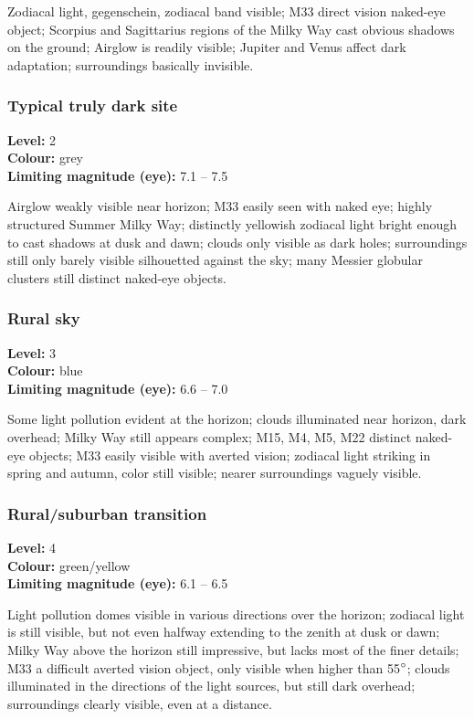 Zodiacal light, gegenschein, zodiacal band visible; M33 direct vision naked-eye object; Scorpius and Sagittarius regions of the Milky Way cast obvious shadows on the ground; Airglow is readily visible; Jupiter and Venus affect dark adaptation; surroundings basically invisible.

\subsubsection{Typical truly dark site}
\textbf{Level:} 2 \\
\textbf{Colour:} grey \\
\textbf{Limiting magnitude (eye):} 7.1 -- 7.5

Airglow weakly visible near horizon; M33 easily seen with naked eye; highly structured Summer Milky Way; distinctly yellowish zodiacal light bright enough to cast shadows at dusk and dawn; clouds only visible as dark holes; surroundings still only barely visible silhouetted against the sky; many Messier globular clusters still distinct naked-eye objects.

\subsubsection{Rural sky}
\textbf{Level:} 3 \\
\textbf{Colour:} blue \\
\textbf{Limiting magnitude (eye):} 6.6 -- 7.0

Some light pollution evident at the horizon; clouds illuminated near horizon, dark overhead; Milky Way still appears complex; M15, M4, M5, M22 distinct naked-eye objects; M33 easily visible with averted vision; zodiacal light striking in spring and
autumn, color still visible; nearer surroundings vaguely visible.

\subsubsection{Rural/suburban transition}
\textbf{Level:} 4 \\
\textbf{Colour:} green/yellow \\
\textbf{Limiting magnitude (eye):} 6.1 -- 6.5

Light pollution domes visible in various directions over the horizon; zodiacal light is still visible, but not even halfway extending to the zenith at dusk or dawn; Milky Way above the horizon still impressive, but lacks most of the finer details; M33 a difficult averted vision object, only visible when higher than 55$\degree$; clouds illuminated in the directions of the light sources, but still dark overhead; surroundings clearly visible, even at a distance.

